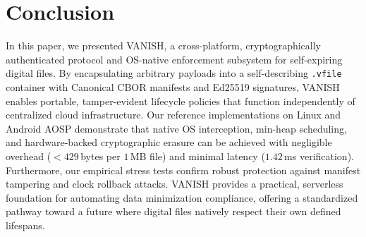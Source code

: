 \section{Conclusion}
\label{sec:conclusion}
In this paper, we presented VANISH, a cross-platform, cryptographically authenticated protocol and OS-native enforcement subsystem for self-expiring digital files. By encapsulating arbitrary payloads into a self-describing \texttt{.vfile} container with Canonical CBOR manifests and Ed25519 signatures, VANISH enables portable, tamper-evident lifecycle policies that function independently of centralized cloud infrastructure. Our reference implementations on Linux and Android AOSP demonstrate that native OS interception, min-heap scheduling, and hardware-backed cryptographic erasure can be achieved with negligible overhead ($< 429$\,bytes per $1$\,MB file) and minimal latency ($1.42$\,ms verification). Furthermore, our empirical stress tests confirm robust protection against manifest tampering and clock rollback attacks. VANISH provides a practical, serverless foundation for automating data minimization compliance, offering a standardized pathway toward a future where digital files natively respect their own defined lifespans.
